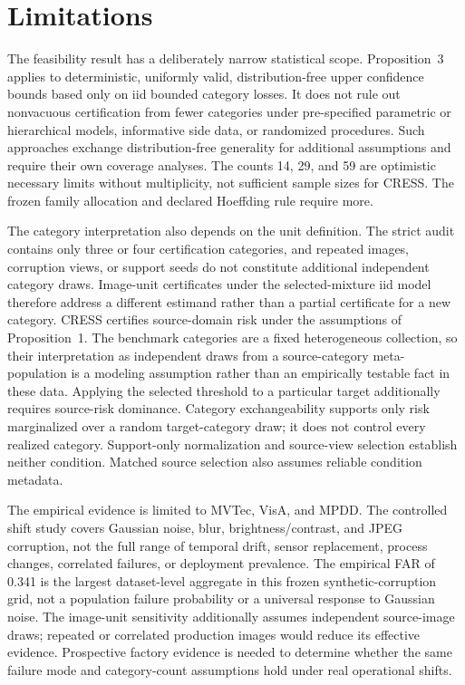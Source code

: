 \section{Limitations}\label{sec:limitations}
The feasibility result has a deliberately narrow statistical scope. Proposition~3 applies to deterministic, uniformly valid, distribution-free upper confidence bounds based only on iid bounded category losses. It does not rule out nonvacuous certification from fewer categories under pre-specified parametric or hierarchical models, informative side data, or randomized procedures. Such approaches exchange distribution-free generality for additional assumptions and require their own coverage analyses. The counts 14, 29, and 59 are optimistic necessary limits without multiplicity, not sufficient sample sizes for CRESS. The frozen family allocation and declared Hoeffding rule require more.

The category interpretation also depends on the unit definition. The strict audit contains only three or four certification categories, and repeated images, corruption views, or support seeds do not constitute additional independent category draws. Image-unit certificates under the selected-mixture iid model therefore address a different estimand rather than a partial certificate for a new category. CRESS certifies source-domain risk under the assumptions of Proposition~1. The benchmark categories are a fixed heterogeneous collection, so their interpretation as independent draws from a source-category meta-population is a modeling assumption rather than an empirically testable fact in these data. Applying the selected threshold to a particular target additionally requires source-risk dominance. Category exchangeability supports only risk marginalized over a random target-category draw; it does not control every realized category. Support-only normalization and source-view selection establish neither condition. Matched source selection also assumes reliable condition metadata.

The empirical evidence is limited to MVTec, VisA, and MPDD. The controlled shift study covers Gaussian noise, blur, brightness/contrast, and JPEG corruption, not the full range of temporal drift, sensor replacement, process changes, correlated failures, or deployment prevalence. The empirical FAR of 0.341 is the largest dataset-level aggregate in this frozen synthetic-corruption grid, not a population failure probability or a universal response to Gaussian noise. The image-unit sensitivity additionally assumes independent source-image draws; repeated or correlated production images would reduce its effective evidence. Prospective factory evidence is needed to determine whether the same failure mode and category-count assumptions hold under real operational shifts.

